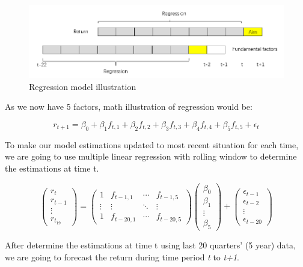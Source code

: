 \documentclass[]{article}
\begin{document}
\begin{figure}[H]
\begin{center}
\includegraphics[width=5in]{Lab//RegModel.png}
\caption{Regression model illustration}
\label{figure4}
\end{center}
\end{figure}

As we now have 5 factors, math illustration of regression would be:

\[
r_{t+1} = \beta_0 + \beta_1f_{t,1} + \beta_2f_{t,2} + \beta_3f_{t,3} + \beta_4f_{t,4} + \beta_5f_{t,5} + \epsilon_t
\]

To make our model estimations updated to most recent situation for each
time, we are going to use multiple linear regression with rolling window
to determine the estimations at time t.

\[
\left(\begin{array}{c}
r_t\\
r_{t-1}\\
\vdots \\
r_{t_19}
\end{array}\right)=
\left(\begin{array}{cccc}
1 & f_{t-1,1} & \cdots & f_{t-1,5}\\
\vdots & \vdots & \ddots & \vdots \\
1 & f_{t-20,1} & \cdots & f_{t-20,5}
\end{array}\right)
\left(\begin{array}{c}
\beta_0\\
\beta_1\\
\vdots \\
\beta_5
\end{array}\right)+
\left(\begin{array}{c}
\epsilon_{t-1}\\
\epsilon_{t-2}\\
\vdots \\
\epsilon_{t-20}
\end{array}\right)
\]

After determine the estimations at time t using last 20 quarters' (5
year) data, we are going to forecast the return during time period
\emph{t} to \emph{t+1}.
\end{document}
